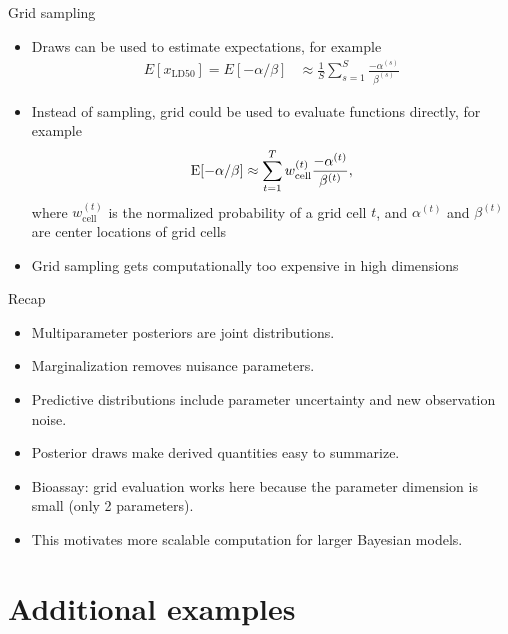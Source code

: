\documentclass[10pt]{beamer}
\begin{document}
\begin{frame}{Grid sampling}

  \begin{itemize}
  \item[-] Draws can be used to estimate expectations, for example
    \begin{align*}
      E[x_{\mathrm{LD50}}] = E[-\alpha/\beta] & \approx \frac{1}{S}\sum_{s=1}^{S} \frac{-\alpha^{(s)}}{\beta^{(s)}}
    \end{align*}
  \item<2->[-] Instead of sampling, grid could be used to evaluate
    functions directly, for example
    \begin{align*}
      \mathrm{E}[-\alpha/\beta] \approx \sum_{t=1}^{T} w_{\mathrm{cell}}^{(t)} \frac{-\alpha^{(t)}}{\beta^{(t)}},
    \end{align*}
    where $w_{\mathrm{cell}}^{(t)}$ is the normalized probability of a grid cell $t$, and $\alpha^{(t)}$ and $\beta^{(t)}$ are center locations of grid cells
  \item<3-> Grid sampling gets computationally too expensive in high
    dimensions
  \end{itemize}

\end{frame}

\begin{frame}{Recap}

  \begin{itemize}
  \item Multiparameter posteriors are joint distributions.\pause
  \item Marginalization removes nuisance parameters.\pause
  \item Predictive distributions include parameter uncertainty and new
    observation noise.\pause
  \item Posterior draws make derived quantities easy to summarize.\pause
  \item Bioassay: grid evaluation works here because the parameter dimension is
    small (only 2 parameters).\pause
  \item This motivates more scalable computation for larger Bayesian models.
  \end{itemize}

\end{frame}

\section{Additional examples}
\end{document}
